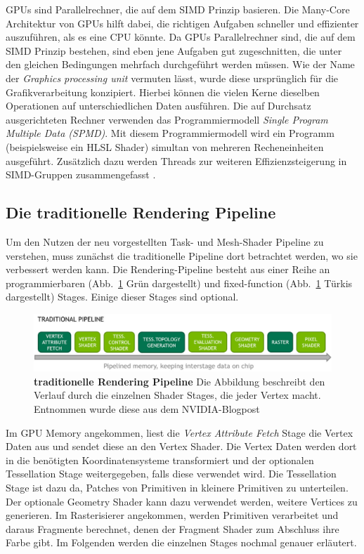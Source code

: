 GPUs sind Parallelrechner, die auf dem SIMD Prinzip basieren.
Die Many-Core Architektur von GPUs hilft dabei, die richtigen Aufgaben schneller und effizienter auszuführen, als es eine CPU könnte.
Da GPUs Parallelrechner sind, die auf dem SIMD Prinzip bestehen, sind eben jene Aufgaben gut zugeschnitten, die unter den gleichen Bedingungen mehrfach durchgeführt werden müssen.
Wie der Name der \textit{Graphics processing unit} vermuten lässt, wurde diese ursprünglich für die Grafikverarbeitung konzipiert.
Hierbei können die vielen Kerne dieselben Operationen auf unterschiedlichen Daten ausführen.
Die auf Durchsatz ausgerichteten Rechner verwenden das Programmiermodell \textit{Single Program Multiple Data (SPMD)}.
Mit diesem Programmiermodell wird ein Programm (beispielsweise ein HLSL Shader) simultan von mehreren Recheneinheiten ausgeführt.
Zusätzlich dazu werden Threads zur weiteren Effizienzsteigerung in SIMD-Gruppen zusammengefasst \cite{Yilmazer2014}.
\newpage

\subsection{Die traditionelle Rendering Pipeline}
\label{subsec:traditionelle_renderingpipeline}
Um den Nutzen der neu vorgestellten Task- und Mesh-Shader Pipeline zu verstehen, muss zunächst die traditionelle Pipeline dort betrachtet werden, wo sie verbessert werden kann.
Die Rendering-Pipeline besteht aus einer Reihe an programmierbaren (Abb.~\ref{fig:traditional_pipeline} Grün dargestellt) und fixed-function (Abb.~\ref{fig:traditional_pipeline} Türkis dargestellt) Stages.
Einige dieser Stages sind optional.
\begin{figure}[htb]
  \centering  
  \includegraphics[scale=0.43]{Bilder/traditionelle_pipeline.jpg}
  \caption[traditionelle Rendering Pipeline]{\textbf{traditionelle Rendering Pipeline} \newline Die Abbildung beschreibt den Verlauf durch die einzelnen Shader Stages, die jeder Vertex macht. Entnommen wurde diese aus dem NVIDIA-Blogpost \cite{Kubisch2018}}
  \label{fig:traditional_pipeline}
\end{figure}
\newline
Im GPU Memory angekommen, liest die \textit{Vertex Attribute Fetch} Stage die Vertex Daten aus und sendet diese an den Vertex Shader.
Die Vertex Daten werden dort in die benötigten Koordinatensysteme transformiert und der optionalen Tessellation Stage weitergegeben, falls diese verwendet wird.
Die Tessellation Stage ist dazu da, Patches von Primitiven in kleinere Primitiven zu unterteilen.
Der optionale Geometry Shader kann dazu verwendet werden, weitere Vertices zu generieren.
Im Rasterisierer angekommen, werden Primitiven verarbeitet und daraus Fragmente berechnet, denen der Fragment Shader zum Abschluss ihre Farbe gibt. \newline
Im Folgenden werden die einzelnen Stages nochmal genauer erläutert.

